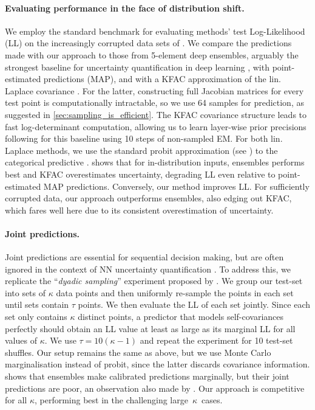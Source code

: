 \paragraph{Evaluating performance in the face of distribution shift.} We employ the standard benchmark for evaluating methods' test Log-Likelihood (LL) on the increasingly corrupted data sets of \textcite{hendrycks2016baseline,ovadia2019}.
We compare the predictions made with our approach to those from 5-element deep ensembles, arguably the strongest baseline for uncertainty quantification in deep learning \citep{lakshminarayanan2017,ashukha2020pitfalls}, with point-estimated predictions (MAP), and with a KFAC approximation of the lin. Laplace covariance  \citep{ritter2018scalable}. For the latter, constructing full Jacobian matrices for every test point is computationally intractable, so we use 64 samples for prediction, as suggested in \cref{sec:sampling_is_efficient}. The KFAC covariance structure leads to fast log-determinant computation, allowing us to learn layer-wise prior precisions following \textcite{Immer2021Marginal} for this baseline using 10 steps of non-sampled EM. For both lin. Laplace methods, we use the standard probit approximation (see ) to the categorical predictive \citep{daxberger2021bayesian}.
 shows that for in-distribution inputs, ensembles performs best and KFAC overestimates uncertainty, degrading LL even relative to point-estimated MAP predictions. Conversely, our method improves LL. For sufficiently corrupted data, our approach outperforms ensembles, also edging out KFAC, which fares well here due to its consistent overestimation of uncertainty. 

\paragraph{Joint predictions.} Joint predictions are essential for sequential decision making, but are often ignored in the context of NN uncertainty quantification \citep{Janz19successor}. To address this, we replicate the ``\textit{dyadic sampling}'' experiment proposed by \textcite{osband2022evaluating}. We group our test-set into sets of \label{ntn:dyadic_sampling_kappa}$\kappa$ data points and then uniformly re-sample the points in each set until sets contain $\tau$ points\label{ntn:dyadic_sampling_tau}. We then evaluate the LL of each set jointly. Since each set only contains $\kappa$ distinct points, a predictor that models self-covariances perfectly should obtain an LL value at least as large as its marginal LL for all values of $\kappa$.  We use $\tau{=}10(\kappa-1)$
and repeat the experiment for 10 test-set shuffles. 
Our setup remains the same as above, but we use Monte Carlo marginalisation instead of probit, since the latter discards covariance information.  shows that ensembles make calibrated predictions marginally, but their joint predictions are poor, an observation also made by \textcite{Osband2021epistemic}. Our approach is competitive for all $\kappa$, performing best in the challenging large~$\kappa$~cases.

